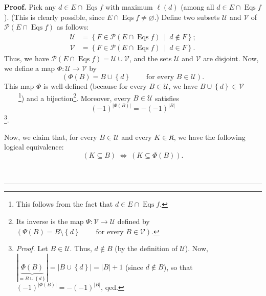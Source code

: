 \documentclass[numbers=enddot,12pt,final,onecolumn,notitlepage]{scrartcl}%
\theoremstyle{definition}
\newenvironment{proof}[1][Proof]{\noindent\textbf{#1.} }{\ \rule{0.5em}{0.5em}}
\newenvironment{vershort}{}{}
\begin{document}
\begin{vershort}
\begin{proof}
Pick any $d\in E\cap\operatorname*{Eqs}f$ with maximum $\ell\left(  d\right)
$ (among all $d\in E\cap\operatorname*{Eqs}f$). (This is clearly possible,
since $E\cap\operatorname*{Eqs}f\neq\varnothing$.) Define two subsets
$\mathcal{U}$ and $\mathcal{V}$ of $\mathcal{P}\left(  E\cap
\operatorname*{Eqs}f\right)  $ as follows:%
\begin{align*}
\mathcal{U}  &  =\left\{  F\in\mathcal{P}\left(  E\cap\operatorname*{Eqs}%
f\right)  \ \mid\ d\notin F\right\}  ;\\
\mathcal{V}  &  =\left\{  F\in\mathcal{P}\left(  E\cap\operatorname*{Eqs}%
f\right)  \ \mid\ d\in F\right\}  .
\end{align*}
Thus, we have $\mathcal{P}\left(  E\cap\operatorname*{Eqs}f\right)
=\mathcal{U}\cup\mathcal{V}$, and the sets $\mathcal{U}$ and $\mathcal{V}$ are
disjoint. Now, we define a map $\Phi:\mathcal{U}\rightarrow\mathcal{V}$ by%
\[
\left(  \Phi\left(  B\right)  =B\cup\left\{  d\right\}
\ \ \ \ \ \ \ \ \ \ \text{for every }B\in\mathcal{U}\right)  .
\]
This map $\Phi$ is well-defined (because for every $B\in\mathcal{U}$, we have
$B\cup\left\{  d\right\}  \in\mathcal{V}$\ \ \ \ \footnote{This follows from
the fact that $d\in E\cap\operatorname*{Eqs}f$.}) and a bijection\footnote{Its
inverse is the map $\Psi:\mathcal{V}\rightarrow\mathcal{U}$ defined by
$\left(  \Psi\left(  B\right)  =B\setminus\left\{  d\right\}
\ \ \ \ \ \ \ \ \ \ \text{for every }B\in\mathcal{V}\right)  $.}. Moreover,
every $B\in\mathcal{U}$ satisfies%
\begin{equation}
\left(  -1\right)  ^{\left\vert \Phi\left(  B\right)  \right\vert }=-\left(
-1\right)  ^{\left\vert B\right\vert } \label{pf.lem.NBCm.moeb.short.Phi.-1}%
\end{equation}
\footnote{\textit{Proof.} Let $B\in\mathcal{U}$. Thus, $d\notin B$ (by the
definition of $\mathcal{U}$). Now, $\left\vert \underbrace{\Phi\left(
B\right)  }_{=B\cup\left\{  d\right\}  }\right\vert =\left\vert B\cup\left\{
d\right\}  \right\vert =\left\vert B\right\vert +1$ (since $d\notin B$), so
that $\left(  -1\right)  ^{\left\vert \Phi\left(  B\right)  \right\vert
}=-\left(  -1\right)  ^{\left\vert B\right\vert }$, qed.}.

Now, we claim that, for every $B\in\mathcal{U}$ and every $K\in\mathfrak{K}$,
we have the following logical equivalence:%
\begin{equation}
\left(  K\subseteq B\right)  \ \Longleftrightarrow\ \left(  K\subseteq
\Phi\left(  B\right)  \right)  . \label{pf.lem.NBCm.moeb.short.Phi.equiv}%
\end{equation}



\end{proof}
\end{vershort}
\end{document}
